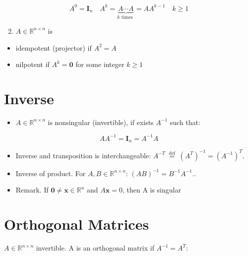 \documentclass[11pt]{book}
\begin{document}
$$
A^{0}=\mathbf{I}_{n} \quad A^{k}=\underbrace{A \cdots A}_{k \text { times }}=A A^{k-1} \quad k \geq 1
$$

\begin{enumerate}
  \setcounter{enumi}{1}
  \item $A \in \mathbb{R}^{n \times n}$ is
\end{enumerate}

\begin{itemize}
  \item idempotent (projector) if $A^{2}=A$

  \item nilpotent if $A^{k}=\mathbf{0}$ for some integer $k \geq 1$

\end{itemize}

\section*{Inverse}
\begin{itemize}
  \item $A \in \mathbb{R}^{n \times n}$ is nonsingular (invertible), if exists $A^{-1}$ such that:
\end{itemize}

$$
A A^{-1}=\mathbf{I}_{n}=A^{-1} A
$$

\begin{itemize}
  \item Inverse and transposition is interchangeable: $
A^{-T} \stackrel{\text { def }}{=}\left(A^{T}\right)^{-1}=\left(A^{-1}\right)^{T}
$.
\end{itemize}



\begin{itemize}
  \item Inverse of product. For $A, B \in \mathbb{R}^{n \times n}$: $
(A B)^{-1}=B^{-1} A^{-1}.
$.
\end{itemize}



\begin{itemize}
  \item Remark. If $\mathbf{0} \neq \mathbf{x} \in \mathbb{R}^{n}$ and $A \mathbf{x}=0$, then $\mathrm{A}$ is singular
\end{itemize}

\section*{Orthogonal Matrices}
$A \in \mathbb{R}^{n \times n}$ invertible. A is an orthogonal matrix if $A^{-1}=A^{T}$:
\end{document}
